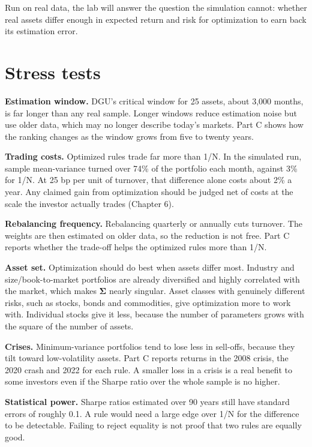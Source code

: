 Run on real data, the lab will answer the question the simulation cannot: whether real assets differ enough in expected return and risk for optimization to earn back its estimation error.

\section{Stress tests}
\label{sec:19-stress}

\textbf{Estimation window.} DGU's critical window for 25 assets, about 3,000 months, is far longer than any real sample. Longer windows reduce estimation noise but use older data, which may no longer describe today's markets. Part C shows how the ranking changes as the window grows from five to twenty years.

\textbf{Trading costs.} Optimized rules trade far more than 1/N. In the simulated run, sample mean-variance turned over 74\% of the portfolio each month, against 3\% for 1/N. At 25 bp per unit of turnover, that difference alone costs about 2\% a year. Any claimed gain from optimization should be judged net of costs at the scale the investor actually trades (Chapter 6).

\textbf{Rebalancing frequency.} Rebalancing quarterly or annually cuts turnover. The weights are then estimated on older data, so the reduction is not free. Part C reports whether the trade-off helps the optimized rules more than 1/N.

\textbf{Asset set.} Optimization should do best when assets differ most. Industry and size/book-to-market portfolios are already diversified and highly correlated with the market, which makes $\boldsymbol{\Sigma}$ nearly singular. Asset classes with genuinely different risks, such as stocks, bonds and commodities, give optimization more to work with. Individual stocks give it less, because the number of parameters grows with the square of the number of assets.

\textbf{Crises.} Minimum-variance portfolios tend to lose less in sell-offs, because they tilt toward low-volatility assets. Part C reports returns in the 2008 crisis, the 2020 crash and 2022 for each rule. A smaller loss in a crisis is a real benefit to some investors even if the Sharpe ratio over the whole sample is no higher.

\textbf{Statistical power.} Sharpe ratios estimated over 90 years still have standard errors of roughly 0.1. A rule would need a large edge over 1/N for the difference to be detectable. Failing to reject equality is not proof that two rules are equally good.

